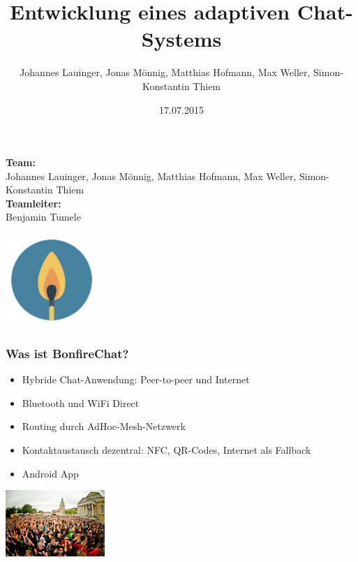 \documentclass[accentcolor=tud2d,colorbacktitle]{tudbeamer}
\title{Entwicklung eines adaptiven Chat-Systems\\}
\author{Johannes Lauinger, Jonas Mönnig, Matthias Hofmann, Max Weller, Simon-Konstantin Thiem}
\date{17.07.2015}
\begin{document}
\begin{titleframe}
    \textbf{Team:}\\
    Johannes Lauinger, Jonas Mönnig, Matthias Hofmann, Max Weller, Simon-Konstantin Thiem\\
    \vspace{0.5cm}
    \textbf{Teamleiter:}\\
    Benjamin Tumele
    \begin{flushright}
      \includegraphics[height=3.5cm]{icon.png}
    \end{flushright}
  \end{titleframe}

  \begin{frame}
    \frametitle{Was ist BonfireChat?}
    \begin{itemize}
      \item Hybride Chat-Anwendung: Peer-to-peer und Internet
      \item Bluetooth und WiFi Direct
      \item Routing durch AdHoc-Mesh-Netzwerk
      \item Kontaktaustausch dezentral: NFC, QR-Codes, Internet als Fallback
      \item Android App
    \end{itemize}
    \begin{flushright}
      \includegraphics[height=2.5cm]{sgf.jpg}
    \end{flushright}
  \end{frame}
\end{document}
